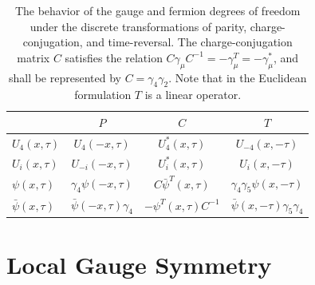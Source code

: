 \begin{table}[htbp]
  \centering
  \begin{tabular}{lccc}
    \toprule
     & \(P\) & \(C\) & \(T\) \\
    \midrule
    \(U_4(x, \tau)\) & \(U_4(-x, \tau)\) & \(U_4^{*}(x, \tau)\) & \(U_{-4}(x, -\tau)\) \\
    \(U_i(x, \tau)\) & \(U_{-i}(-x, \tau)\) & \(U_i^{*}(x, \tau)\) & \(U_i(x, -\tau)\) \\
    \(\psi(x, \tau)\) & \(\gamma_4 \psi(-x, \tau)\) & \(C\bar{\psi}^{T}(x, \tau)\) & \(\gamma_4 \gamma_5 \psi(x, -\tau)\) \\
    \(\bar{\psi}(x, \tau)\) & \(\bar{\psi}(-x, \tau)\gamma_4\) & \(-\psi^{T}(x, \tau)C^{-1}\) & \(\bar{\psi}(x, -\tau)\gamma_5 \gamma_4\) \\
    \bottomrule
  \end{tabular}
  \caption{The behavior of the gauge and fermion degrees of freedom under the discrete transformations of parity, charge-conjugation, and time-reversal. The charge-conjugation matrix \(C\) satisfies the relation \(C\gamma_\mu C^{-1} = -\gamma_\mu^{T} = -\gamma_\mu^{*}\), and shall be represented by \(C = \gamma_4 \gamma_2\). Note that in the Euclidean formulation \(T\) is a linear operator.}
  \label{tab:2}
\end{table}

\section{Local Gauge Symmetry}

